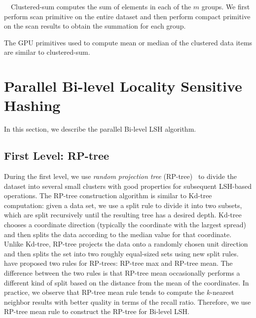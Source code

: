  \ \ Clustered-sum computes the sum of elements in each of the $m$ groups. We first perform scan primitive on the entire dataset and then perform compact primitive on the scan results to obtain the summation for each group.

\noindent {}

The GPU primitives used to compute mean or median of the clustered data items are similar to clustered-sum.


\section{Parallel Bi-level Locality Sensitive Hashing}
\label{sec:6:parallel}
In this section, we describe the parallel Bi-level LSH algorithm.

\subsection{First Level: RP-tree}
During the first level, we use \emph{random projection tree} (RP-tree)~\cite{yoav:nips:2007,Dasgupta:2008} to divide the dataset into several small clusters with good properties for subsequent LSH-based operations. The RP-tree construction algorithm is similar to Kd-tree computation: given a data set, we use a split rule to divide it into two subsets, which are split recursively until the resulting tree has a desired depth. Kd-tree chooses a coordinate direction (typically the coordinate with the largest spread) and then splits the data according to the median value for that coordinate. Unlike Kd-tree, RP-tree projects the data onto a randomly chosen unit direction and then splits the set into two roughly equal-sized sets using new split rules. \cite{Dasgupta:2008} have proposed two rules for RP-trees: RP-tree max and RP-tree mean. The difference between the two rules is that RP-tree mean occasionally performs a different kind of split based on the distance from the mean of the coordinates. In practice, we observe that RP-tree mean rule tends to compute the $k$-nearest neighbor results with better quality in terms of the recall ratio. Therefore, we use RP-tree mean rule to construct the RP-tree for Bi-level LSH.


